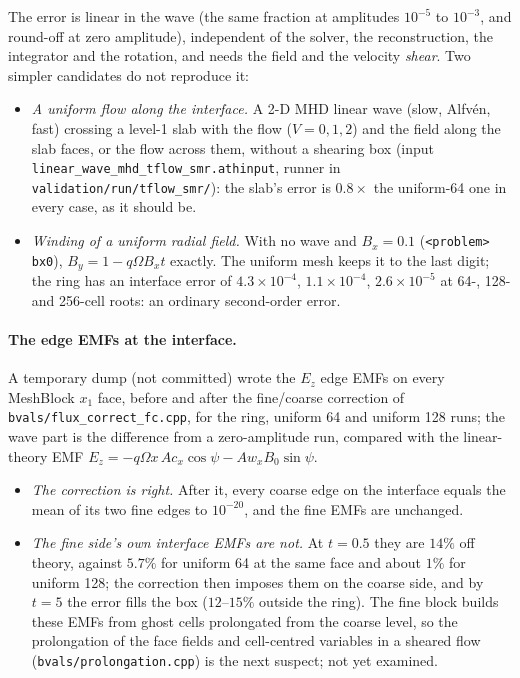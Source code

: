 \documentclass[11pt]{article}
\newcommand{\code}[1]{\texttt{#1}}
\newcommand{\file}[1]{\texttt{#1}}
\begin{document}
The error is linear in the wave (the same fraction at amplitudes $10^{-5}$ to $10^{-3}$, and
round-off at zero amplitude), independent of the solver, the reconstruction, the
integrator and the rotation, and needs the field and the velocity \emph{shear}. Two simpler
candidates do not reproduce it:
\begin{itemize}\itemsep2pt
\item \emph{A uniform flow along the interface.} A 2-D MHD linear wave (slow, Alfv\'en, fast)
      crossing a level-1 slab with the flow ($V = 0, 1, 2$) and the field along the slab faces,
      or the flow across them, without a shearing box (input
      \file{linear\_wave\_mhd\_tflow\_smr.athinput}, runner in
      \file{validation/run/tflow\_smr/}): the slab's error is $0.8\times$ the uniform-64 one in
      every case, as it should be.
\item \emph{Winding of a uniform radial field.} With no wave and $B_x = 0.1$
      (\code{<problem> bx0}), $B_y = 1 - q\Omega B_x t$ exactly. The uniform mesh keeps it to the
      last digit; the ring has an interface error of $4.3\times10^{-4}$, $1.1\times10^{-4}$,
      $2.6\times10^{-5}$ at 64-, 128- and 256-cell roots: an ordinary second-order error.
\end{itemize}

\paragraph{The edge EMFs at the interface.} A temporary dump (not committed) wrote the $E_z$
edge EMFs on every MeshBlock $x_1$ face, before and after the fine/coarse correction of
\file{bvals/flux\_correct\_fc.cpp}, for the ring, uniform 64 and uniform 128 runs; the wave
part is the difference from a zero-amplitude run, compared with the linear-theory EMF
$E_z = -q\Omega x\,A c_x\cos\psi - A w_x B_0\sin\psi$.
\begin{itemize}\itemsep2pt
\item \emph{The correction is right.} After it, every coarse edge on the interface equals the
      mean of its two fine edges to $10^{-20}$, and the fine EMFs are unchanged.
\item \emph{The fine side's own interface EMFs are not.} At $t = 0.5$ they are $14\%$ off theory,
      against $5.7\%$ for uniform 64 at the same face and about $1\%$ for uniform 128; the
      correction then imposes them on the coarse side, and by $t = 5$ the error fills the box
      ($12$--$15\%$ outside the ring). The fine block builds these EMFs from ghost cells
      prolongated from the coarse level, so the prolongation of the face fields and
      cell-centred variables in a sheared flow (\file{bvals/prolongation.cpp}) is the next
      suspect; not yet examined.
\end{itemize}
\end{document}
